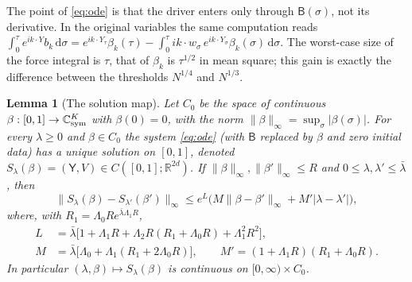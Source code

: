 \documentclass[11pt]{article}
\newcommand{\dd}{\mathrm{d}}
\newcommand{\R}{\mathbb{R}}
\newcommand{\C}{\mathbb{C}}
\newcommand{\sY}{\mathsf{Y}}
\newcommand{\sB}{\mathsf{B}}
\newcommand{\nrm}[1]{\|#1\|_\infty}
\newtheorem{lemma}[theorem]{Lemma}
\theoremstyle{remark}
\begin{document}
The point of \eqref{eq:ode} is that the driver enters only through
$\sB(\sigma)$, not its derivative. In the original variables the same
computation reads
$\int_0^\tau e^{ik\cdot Y}b_k\,\dd\sigma=e^{ik\cdot Y_\tau}\beta_k(\tau)
-\int_0^\tau ik\cdot w_\sigma\,e^{ik\cdot Y_\sigma}\beta_k(\sigma)\,\dd\sigma$.
The worst-case size of the force integral is $\tau$, that of $\beta_k$ is
$\tau^{1/2}$ in mean square; this gain is exactly the difference between the
thresholds $N^{1/4}$ and $N^{1/3}$.

\begin{lemma}[The solution map]\label{lem:map}
Let $C_0$ be the space of continuous $\beta:[0,1]\to\C^K_{\rm sym}$ with
$\beta(0)=0$, with the norm $\nrm{\beta}=\sup_\sigma|\beta(\sigma)|$. For
every $\lambda\ge0$ and $\beta\in C_0$ the system \eqref{eq:ode} (with
$\sB$ replaced by $\beta$ and zero initial data) has a unique solution on
$[0,1]$, denoted $S_\lambda(\beta)=(\sY,V)\in C([0,1];\R^{2d})$. If
$\nrm{\beta},\nrm{\beta'}\le R$ and $0\le\lambda,\lambda'\le\bar\lambda$,
then
\begin{equation}
  \nrm{S_\lambda(\beta)-S_{\lambda'}(\beta')}
  \le e^{L}\bigl(M\nrm{\beta-\beta'}+M'|\lambda-\lambda'|\bigr),
  \label{eq:lip}
\end{equation}
where, with $R_1=\Lambda_0Re^{\bar\lambda\Lambda_1R}$,
\begin{align*}
  L&=\bar\lambda\bigl[1+\Lambda_1R+\Lambda_2R(R_1+\Lambda_0R)
     +\Lambda_1^2R^2\bigr],\\
  M&=\bar\lambda\bigl[\Lambda_0+\Lambda_1(R_1+2\Lambda_0R)\bigr],\qquad
  M'=(1+\Lambda_1R)(R_1+\Lambda_0R).
\end{align*}
In particular $(\lambda,\beta)\mapsto S_\lambda(\beta)$ is continuous on
$[0,\infty)\times C_0$.
\end{lemma}
\end{document}
